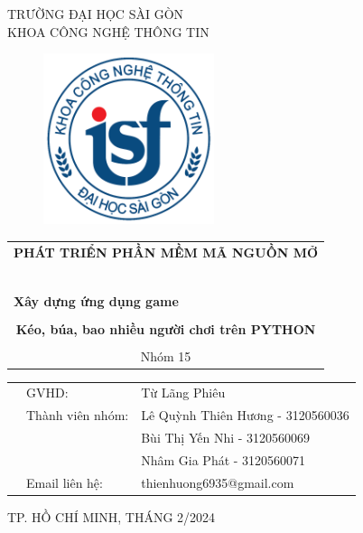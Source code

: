 \documentclass[a4paper]{article}
\begin{document}
\begin{titlepage}
\begin{center}
TRƯỜNG ĐẠI HỌC SÀI GÒN \\
KHOA CÔNG NGHỆ THÔNG TIN
\end{center}
\vspace{1cm}

\begin{figure}[h!]
\begin{center}
\includegraphics[width=5cm]{logoITSGU.png}
\end{center}
\end{figure}

\vspace{1cm}

\begin{center}
\begin{tabular}{c} 
	\multicolumn{1}{l}{\textbf{{\Large PHÁT TRIỂN PHẦN MỀM MÃ NGUỒN MỞ}}}\\ 
	~~\\ 
	
	\\ 
	\multicolumn{1}{l}{\textbf{{\Large Xây dựng ứng dụng game}}}\\ 
	\\ 
	
	\textbf{{\Large Kéo, búa, bao nhiều người chơi trên PYTHON}}\\
\\ 
	{\Large Nhóm 15}\\ 
	
\end{tabular}
\end{center}

\vspace{1cm}

\begin{table}[h]
\centering
\begin{tabular}{rll}
& GVHD: &Từ Lãng Phiêu\\
& Thành viên nhóm:& Lê Quỳnh Thiên Hương - 3120560036\\
& & Bùi Thị Yến Nhi - 3120560069\\
& & Nhâm Gia Phát - 3120560071\\
&Email liên hệ:&thienhuong6935@gmail.com
\end{tabular}
\vspace{1.5 cm}
\end{table}

\begin{center}

{\footnotesize TP. HỒ CHÍ MINH, THÁNG 2/2024}
\end{center}
\end{titlepage}
\end{document}
